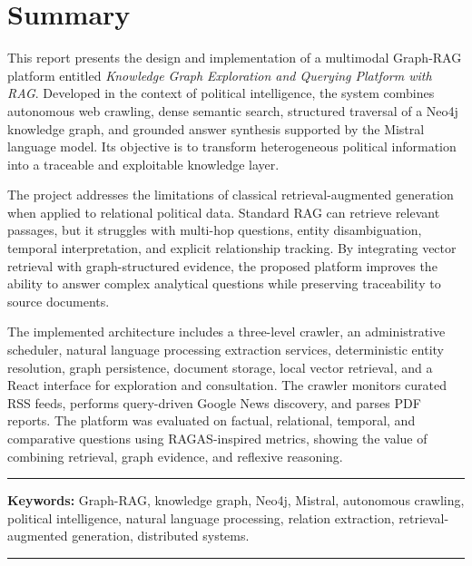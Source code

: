 \chapter*{Summary}

\begingroup
{}

This report presents the design and implementation of a multimodal Graph-RAG platform entitled \textit{Knowledge Graph Exploration and Querying Platform with RAG}. Developed in the context of political intelligence, the system combines autonomous web crawling, dense semantic search, structured traversal of a Neo4j knowledge graph, and grounded answer synthesis supported by the Mistral language model. Its objective is to transform heterogeneous political information into a traceable and exploitable knowledge layer.

The project addresses the limitations of classical retrieval-augmented generation when applied to relational political data. Standard RAG can retrieve relevant passages, but it struggles with multi-hop questions, entity disambiguation, temporal interpretation, and explicit relationship tracking. By integrating vector retrieval with graph-structured evidence, the proposed platform improves the ability to answer complex analytical questions while preserving traceability to source documents.

The implemented architecture includes a three-level crawler, an administrative scheduler, natural language processing extraction services, deterministic entity resolution, graph persistence, document storage, local vector retrieval, and a React interface for exploration and consultation. The crawler monitors curated RSS feeds, performs query-driven Google News discovery, and parses PDF reports. The platform was evaluated on factual, relational, temporal, and comparative questions using RAGAS-inspired metrics, showing the value of combining retrieval, graph evidence, and reflexive reasoning.

\noindent\rule[2pt]{\textwidth}{0.5pt}

{\textbf{Keywords:}} Graph-RAG, knowledge graph, Neo4j, Mistral, autonomous crawling, political intelligence, natural language processing, relation extraction, retrieval-augmented generation, distributed systems.

\noindent\rule[2pt]{\textwidth}{0.5pt}
\endgroup
